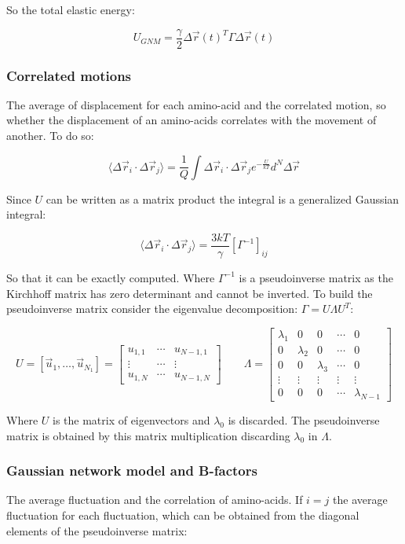 	So the total elastic energy:

	$$U_{GNM} = \frac{\gamma}{2}\Delta\vec{r}(t)^T\Gamma\Delta\vec{r}(t)$$

		\subsubsection{Correlated motions}
		The average of displacement for each amino-acid and the correlated motion, so whether the displacement of an amino-acids correlates with the movement of another.
		To do so:

		$$\langle\Delta\vec{r}_i\cdot\Delta\vec{r}_j\rangle = \frac{1}{Q}\int\Delta\vec{r}_i\cdot\Delta\vec{r}_je^{-\frac{U}{kT}}d^N\Delta\vec{r}$$

		Since $U$ can be written as a matrix product the integral is a generalized Gaussian integral:

		$$\langle\Delta\vec{r}_i\cdot\Delta\vec{r}_j\rangle = \frac{3kT}{\gamma}[\Gamma^{-1}]_{ij}$$

		So that it can be exactly computed.
		Where $\Gamma^{-1}$ is a pseudoinverse matrix as the Kirchhoff matrix has zero determinant and cannot be inverted.
		To build the pseudoinverse matrix consider the eigenvalue decomposition: $\Gamma = U\Lambda U^T$:

		$$U = [\vec{u}_1, \dots, \vec{u}_{N_1}] = \begin{bmatrix} u_{1,1} & \cdots & u_{N-1,1}\\\vdots & \cdots & \vdots\\ u_{1, N} & \cdots & u_{N-1, N}\end{bmatrix}\qquad\Lambda = \begin{bmatrix} \lambda_1 & 0 & 0 & \cdots & 0\\ 0 & \lambda_2 & 0 &\cdots & 0\\0 & 0& \lambda_3 & \cdots & 0\\\vdots & \vdots & \vdots & \vdots &\vdots\\ 0 & 0 & 0 & \cdots & \lambda_{N-1}\end{bmatrix}$$

		Where $U$ is the matrix of eigenvectors and $\lambda_0$ is discarded.
		The pseudoinverse matrix is obtained by this matrix multiplication discarding $\lambda_0$ in $\Lambda$.

		\subsubsection{Gaussian network model and B-factors}
		The average fluctuation and the correlation of amino-acids.
		If $i=j$ the average fluctuation for each fluctuation, which can be obtained from the diagonal elements of the pseudoinverse matrix:


